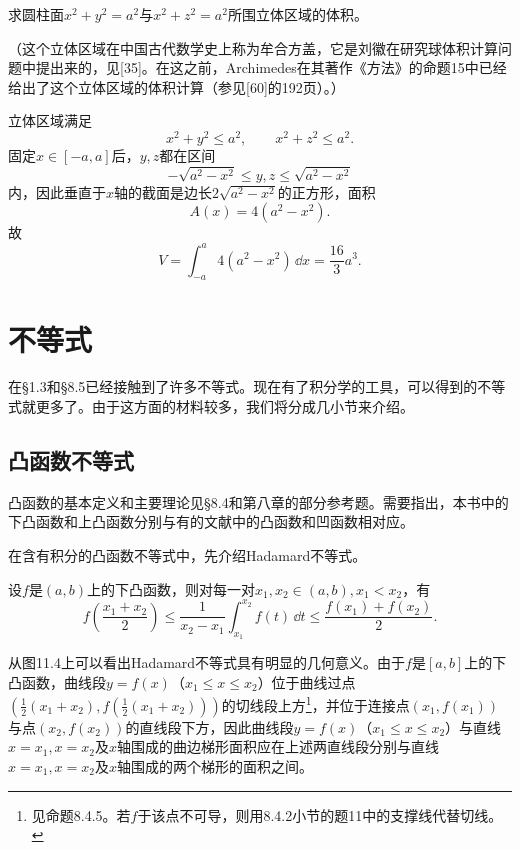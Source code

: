 \begin{xexercise}[10]
求圆柱面$x^2+y^2=a^2$与$x^2+z^2=a^2$所围立体区域的体积。

  （这个立体区域在中国古代数学史上称为牟合方盖，它是刘徽在研究球体积计算问题中提出来的，见[35]。在这之前，Archimedes在其著作《方法》的命题15中已经给出了这个立体区域的体积计算（参见[60]的192页）。）
\end{xexercise}
\begin{xsolution}
立体区域满足
\[
 x^2+y^2\le a^2,\qquad x^2+z^2\le a^2.
\]
固定$x\in[-a,a]$后，$y,z$都在区间
\[
 -\sqrt{a^2-x^2}\le y,z\le\sqrt{a^2-x^2}
\]
内，因此垂直于$x$轴的截面是边长$2\sqrt{a^2-x^2}$的正方形，面积
\[
 A(x)=4(a^2-x^2).
\]
故
\[
 V=\int_{-a}^a4(a^2-x^2)\,\dd x
 =\boxed{\frac{16}{3}a^3}.
\]
\end{xsolution}


\section{不等式}

在§1.3和§8.5已经接触到了许多不等式。现在有了积分学的工具，可以得到的不等式就更多了。由于这方面的材料较多，我们将分成几小节来介绍。

\subsection{凸函数不等式}

凸函数的基本定义和主要理论见§8.4和第八章的部分参考题。需要指出，本书中的下凸函数和上凸函数分别与有的文献中的凸函数和凹函数相对应。

在含有积分的凸函数不等式中，先介绍Hadamard不等式。

\begin{xexample}[11.2.1（Hadamard不等式）]
设$f$是$(a,b)$上的下凸函数，则对每一对$x_1,x_2\in(a,b),x_1<x_2$，有
\begin{equation}
  f\left(\frac{x_1+x_2}{2}\right)
  \le\frac1{x_2-x_1}\int_{x_1}^{x_2}f(t)\,\dd t
  \le\frac{f(x_1)+f(x_2)}2.
  \tag{11.7}
  \label{eq:11.7}
\end{equation}
\end{xexample}

从图11.4上可以看出Hadamard不等式具有明显的几何意义。由于$f$是$[a,b]$上的下凸函数，曲线段$y=f(x)$（$x_1\le x\le x_2$）位于曲线过点$\left(\frac12(x_1+x_2),f\left(\frac12(x_1+x_2)\right)\right)$的切线段上方\footnote{见命题8.4.5。若$f$于该点不可导，则用8.4.2小节的题11中的支撑线代替切线。}，并位于连接点$(x_1,f(x_1))$与点$(x_2,f(x_2))$的直线段下方，因此曲线段$y=f(x)$（$x_1\le x\le x_2$）与直线$x=x_1,x=x_2$及$x$轴围成的曲边梯形面积应在上述两直线段分别与直线$x=x_1,x=x_2$及$x$轴围成的两个梯形的面积之间。

